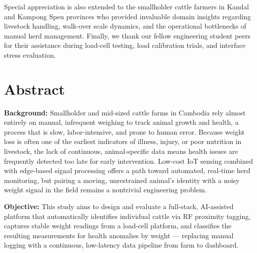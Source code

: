 \documentclass[11pt,a4paper]{report}
\begin{document}
Special appreciation is also extended to the smallholder cattle farmers in Kandal and Kampong Speu provinces who provided invaluable domain insights regarding livestock handling, walk-over scale dynamics, and the operational bottlenecks of manual herd management. Finally, we thank our fellow engineering student peers for their assistance during load-cell testing, load calibration trials, and interface stress evaluation.

\clearpage

\chapter*{Abstract}

\noindent\textbf{Background:} Smallholder and mid-sized cattle farms in Cambodia rely almost entirely on manual, infrequent weighing to track animal growth and health, a process that is slow, labor-intensive, and prone to human error. Because weight loss is often one of the earliest indicators of illness, injury, or poor nutrition in livestock, the lack of continuous, animal-specific data means health issues are frequently detected too late for early intervention. Low-cost IoT sensing combined with edge-based signal processing offers a path toward automated, real-time herd monitoring, but pairing a moving, unrestrained animal's identity with a noisy weight signal in the field remains a nontrivial engineering problem.

\vspace{0.3cm}
\noindent\textbf{Objective:} This study aims to design and evaluate a full-stack, AI-assisted platform that automatically identifies individual cattle via RF proximity tagging, captures stable weight readings from a load-cell platform, and classifies the resulting measurements for health anomalies by weight --- replacing manual logging with a continuous, low-latency data pipeline from farm to dashboard.
\end{document}
